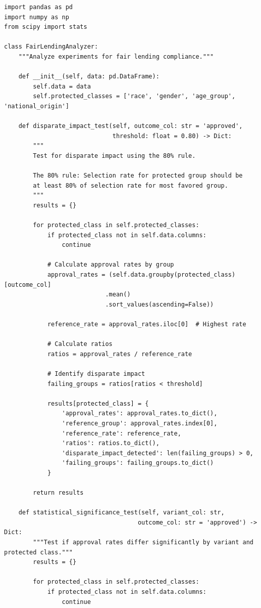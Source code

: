 \lstset{language=Python, caption=Fair Lending Analysis}
\begin{lstlisting}
import pandas as pd
import numpy as np
from scipy import stats

class FairLendingAnalyzer:
    """Analyze experiments for fair lending compliance."""

    def __init__(self, data: pd.DataFrame):
        self.data = data
        self.protected_classes = ['race', 'gender', 'age_group', 'national_origin']

    def disparate_impact_test(self, outcome_col: str = 'approved',
                              threshold: float = 0.80) -> Dict:
        """
        Test for disparate impact using the 80% rule.

        The 80% rule: Selection rate for protected group should be
        at least 80% of selection rate for most favored group.
        """
        results = {}

        for protected_class in self.protected_classes:
            if protected_class not in self.data.columns:
                continue

            # Calculate approval rates by group
            approval_rates = (self.data.groupby(protected_class)[outcome_col]
                            .mean()
                            .sort_values(ascending=False))

            reference_rate = approval_rates.iloc[0]  # Highest rate

            # Calculate ratios
            ratios = approval_rates / reference_rate

            # Identify disparate impact
            failing_groups = ratios[ratios < threshold]

            results[protected_class] = {
                'approval_rates': approval_rates.to_dict(),
                'reference_group': approval_rates.index[0],
                'reference_rate': reference_rate,
                'ratios': ratios.to_dict(),
                'disparate_impact_detected': len(failing_groups) > 0,
                'failing_groups': failing_groups.to_dict()
            }

        return results

    def statistical_significance_test(self, variant_col: str,
                                     outcome_col: str = 'approved') -> Dict:
        """Test if approval rates differ significantly by variant and protected class."""
        results = {}

        for protected_class in self.protected_classes:
            if protected_class not in self.data.columns:
                continue


\end{lstlisting}
